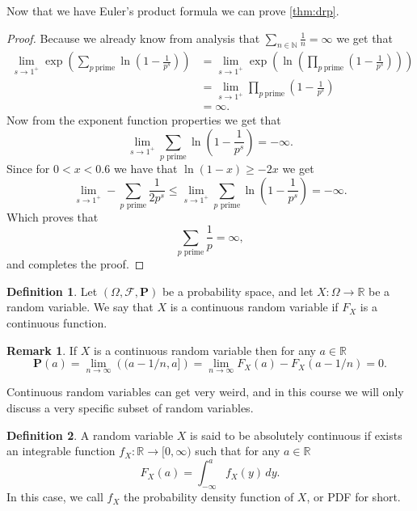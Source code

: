 \documentclass[11pt,a4paper]{article}
\theoremstyle{definition}
\newtheorem{definition}{Definition}[section]
\newtheorem{remark}{Remark}[section]
\theoremstyle{plain}
\newcommand{\N}{\mathbb{N}}
\newcommand{\R}{\mathbb{R}}
\begin{document}
  Now that we have Euler's product formula we can prove \autoref{thm:drp}.
  \begin{proof}
    Because we already know from analysis that 
    $\sum_{n \in \N} \frac 1n = \infty$ we get that
    \begin{align*}
      \lim_{s \to 1^+}
      \exp\left(\sum_{p \ \mathrm{prime}}
      \ln \left(1 - \frac{1}{p^{s}}\right)\right) &=
      \lim_{s \to 1^+}
      \exp \left(\ln\left(\prod_{p \ \mathrm{prime}}
      \left(1 - \frac{1}{p^{s}}\right)\right)\right) \\ &= 
      \lim_{s \to 1^+} 
      \prod_{p \ \mathrm{prime}} \left(1 - \frac{1}{p^{s}}\right) \\ &= 
      \infty.
    \end{align*}
    Now from the exponent function properties we get that
    \[
      \lim_{s \to 1^+} 
      \sum_{p \text{ prime}} \ln\left(1 - \frac{1}{p^{s}}\right) =
      - \infty.
    \]
    Since for $0 < x < 0.6$ we have that $\ln(1-x) \geq -2x$ we get
    \[
      \lim_{s \to 1^+}
      - \sum_{p \text{ prime}} \frac{1}{2 p^s} \le
      \lim_{s \to 1^+}
      \sum_{p \text{ prime}} \ln\left(1 - \frac{1}{p^{s}}\right) =
      - \infty.
    \]
    Which proves that
    \[
      \sum_{p \text{ prime}} \frac{1}{p} = \infty,
    \]
    and completes the proof.
  \end{proof}

  \begin{definition}
    Let $(\Omega, \mathcal F, \mathbf P)$ be a probability space,
    and let $X \colon \Omega \to \R$ be a random variable.
    We say that $X$ is a continuous random variable if $F_X$ is a
    continuous function.
  \end{definition}
  \begin{remark}
    If $X$ is a continuous random variable then for any $a \in \R$
    \[
      \mathbf P(a) = 
      \lim_{n \to \infty}\left((a - 1/n, a]\right) =
      \lim_{n \to \infty} F_X(a) - F_X(a - 1/n) =
      0.
    \]
  \end{remark}
  
  Continuous random variables can get very weird, and in this course we
  will only discuss a very specific subset of random variables.

  \begin{definition}
    A random variable $X$ is said to be absolutely continuous if exists an
    integrable function $f_X \colon \R \to [0,\infty)$ such that for any
    $a \in \R$
    \[
      F_X(a) = \int_{-\infty}^{a} f_X(y)\,dy.
    \]
    In this case, we call $f_X$ the probability density function of $X$,
    or PDF for short.
  \end{definition}
  
\end{document}
